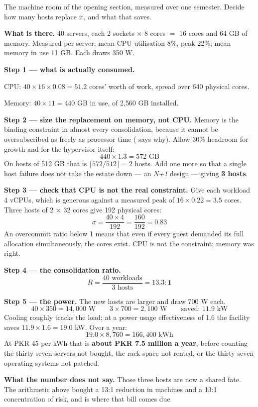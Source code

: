 \begin{worked}
The machine room of the opening section, measured over one semester. Decide how
many hosts replace it, and what that saves.

\smallskip
\textbf{What is there.} 40 servers, each 2 sockets $\times$ 8 cores $=$ 16
cores and 64 GB of memory. Measured per server: mean CPU utilisation 8\%, peak
22\%; mean memory in use 11 GB. Each draws 350 W.

\smallskip
\textbf{Step 1 --- what is actually consumed.}
\begin{tight}
  \item CPU: $40 \times 16 \times 0.08 = 51.2$ cores' worth of work, spread over
        640 physical cores.
  \item Memory: $40 \times 11 = 440$ GB in use, of 2{,}560 GB installed.
\end{tight}

\smallskip
\textbf{Step 2 --- size the replacement on memory, not CPU.} Memory is the
binding constraint in almost every consolidation, because it cannot be
oversubscribed as freely as processor time ( says why). Allow 30\%
headroom for growth and for the hypervisor itself:
\[ 440 \times 1.3 = 572 \text{ GB} \]
On hosts of 512 GB that is $\lceil 572/512 \rceil = 2$ hosts. Add one more so
that a single host failure does not take the estate down --- an \emph{N+1}
design --- giving \textbf{3 hosts}.

\smallskip
\textbf{Step 3 --- check that CPU is not the real constraint.} Give each
workload 4 vCPUs, which is generous against a measured peak of
$16 \times 0.22 = 3.5$ cores. Three hosts of 2 $\times$ 32 cores give 192
physical cores:
\[ \sigma = \frac{40 \times 4}{192} = \frac{160}{192} = 0.83 \]
An overcommit ratio below 1 means that even if every guest demanded its full
allocation simultaneously, the cores exist. CPU is not the constraint; memory
was right.

\smallskip
\textbf{Step 4 --- the consolidation ratio.}
\[ R = \frac{40 \text{ workloads}}{3 \text{ hosts}} = \mathbf{13.3 : 1} \]

\smallskip
\textbf{Step 5 --- the power.} The new hosts are larger and draw 700 W each.
\[ 40 \times 350 = 14{,}000 \text{ W} \qquad 3 \times 700 = 2{,}100 \text{ W}
   \qquad \text{saved: } 11.9 \text{ kW} \]
Cooling roughly tracks the load; at a power usage effectiveness of 1.6 the
facility saves $11.9 \times 1.6 = 19.0$ kW. Over a year:
\[ 19.0 \times 8{,}760 = 166{,}400 \text{ kWh} \]
At PKR 45 per kWh that is \textbf{about PKR 7.5 million a year}, before counting
the thirty-seven servers not bought, the rack space not rented, or the
thirty-seven operating systems not patched.

\smallskip
\textbf{What the number does not say.} Those three hosts are now a shared fate.
The arithmetic above bought a 13:1 reduction in machines and a 13:1
concentration of risk, and  is where that bill comes due.
\end{worked}

